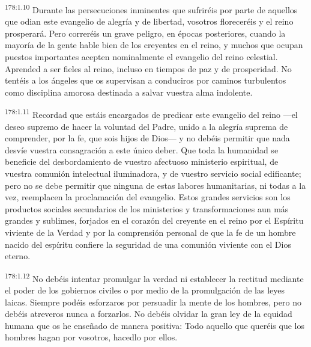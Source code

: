 \par 
\textsuperscript{178:1.10} Durante las persecuciones inminentes que sufriréis por parte de aquellos que odian este evangelio de alegría y de libertad, vosotros floreceréis y el reino prosperará. Pero correréis un grave peligro, en épocas posteriores, cuando la mayoría de la gente hable bien de los creyentes en el reino, y muchos que ocupan puestos importantes acepten nominalmente el evangelio del reino celestial. Aprended a ser fieles al reino, incluso en tiempos de paz y de prosperidad. No tentéis a los ángeles que os supervisan a conduciros por caminos turbulentos como disciplina amorosa destinada a salvar vuestra alma indolente.

\par 
\textsuperscript{178:1.11} Recordad que estáis encargados de predicar este evangelio del reino ---el deseo supremo de hacer la voluntad del Padre, unido a la alegría suprema de comprender, por la fe, que sois hijos de Dios--- y no debéis permitir que nada desvíe vuestra consagración a este único deber. Que toda la humanidad se beneficie del desbordamiento de vuestro afectuoso ministerio espiritual, de vuestra comunión intelectual iluminadora, y de vuestro servicio social edificante; pero no se debe permitir que ninguna de estas labores humanitarias, ni todas a la vez, reemplacen la proclamación del evangelio. Estos grandes servicios son los productos sociales secundarios de los ministerios y transformaciones aun más grandes y sublimes, forjados en el corazón del creyente en el reino por el Espíritu viviente de la Verdad y por la comprensión personal de que la fe de un hombre nacido del espíritu confiere la seguridad de una comunión viviente con el Dios eterno.

\par 
\textsuperscript{178:1.12} No debéis intentar promulgar la verdad ni establecer la rectitud mediante el poder de los gobiernos civiles o por medio de la promulgación de las leyes laicas. Siempre podéis esforzaros por persuadir la mente de los hombres, pero no debéis atreveros nunca a forzarlos. No debéis olvidar la gran ley de la equidad humana que os he enseñado de manera positiva: Todo aquello que queréis que los hombres hagan por vosotros, hacedlo por ellos.

